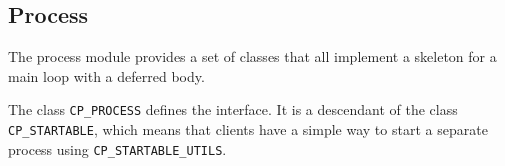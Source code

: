 % 
% 
%   
%     
%   
% 
%     
% 
% 
% 
% 
% 


\subsection{Process}

The process module provides a set of classes that all implement a skeleton for a main loop with a deferred body.

The class \lstinline!CP_PROCESS! defines the interface.
It is a descendant of the class \lstinline!CP_STARTABLE!, which means that clients have a simple way to start a separate process using \lstinline!CP_STARTABLE_UTILS!.

